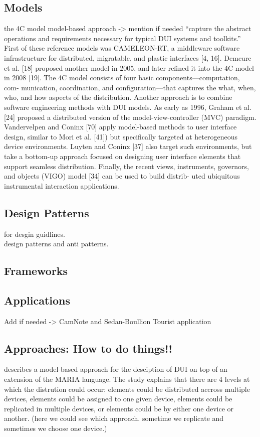 \subsection{Models}
\cite{demeure20084c} the 4C model
\cite{melchior2011distributed} model-based approach -> mention if needed
\cite{elmqvist2011distributed} ``capture the abstract operations and 
requirements necessary for typical DUI systems and toolkits.'' \\
\cite{elmqvist2011distributed} First of these reference models was CAMELEON-RT,
a middleware software infrastructure for distributed, migratable, and plastic interfaces [4, 16]. Demeure et al. [18] proposed another model in 2005, and later refined it into the 4C model in 2008 [19]. The 4C model consists of four basic components—computation, com- munication, coordination, and configuration—that captures the what, when, who, and how aspects of the distribution.
Another approach is to combine software engineering methods with DUI models. As early as 1996, Graham et al. [24] proposed a distributed version of the model-view-controller (MVC) paradigm. Vandervelpen and Coninx [70] apply model-based methods to user interface design, similar to Mori et al. [41]) but specifically targeted at heterogeneous device environments. Luyten and Coninx [37] also target such environments, but take a bottom-up approach focused on designing user interface elements that support seamless distribution. Finally, the recent views, instruments, governors, and objects (VIGO) model [34] can be used to build distrib- uted ubiquitous instrumental interaction applications.

\subsection{Design Patterns}
\cite{vanderdonckt2010distributed} for desgin guidlines.\\
\cite{seifried2011lessons} design patterns and anti patterns.

\subsection{Frameworks}

\subsection{Applications}
Add if needed -> \cite{demeure20084c} CamNote and  Sedan-Boullion Tourist
application

\subsection{Approaches: How to do things!!}
\cite{manca2011distributing} describes a model-based approach for the desciption
of DUI on top of an extension of the MARIA language. The study explains that
there are 4 levels at which the distrution could occur: elements could be
distributed accross multiple devices, elements could be assigned to one given
device, elements could be replicated in multiple devices, or elements could be
by either one device or another. (here we could see which approach. sometime we
replicate and sometimes we choose one device.)

